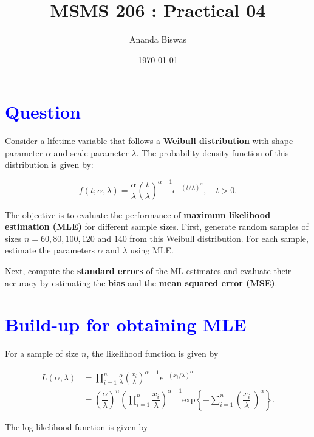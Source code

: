 \documentclass[11pt, a4paper]{article}\usepackage[]{graphicx}\usepackage[]{xcolor}
\title{MSMS 206 : Practical 04}
\author{Ananda Biswas}
\date{\today}
\begin{document}
\maketitle


\section*{\faArrowAltCircleRight[regular] \textcolor{blue}{Question}}

\hspace{1cm} Consider a lifetime variable that follows a \textbf{Weibull distribution} with shape parameter $\alpha$ and scale parameter $\lambda$. The probability density function of this distribution is given by:

\[
f(t; \alpha, \lambda) = \frac{\alpha}{\lambda} \left( \frac{t}{\lambda} \right)^{\alpha - 1} e^{-(t/\lambda)^\alpha}, \quad t > 0.
\]

The objective is to evaluate the performance of \textbf{maximum likelihood estimation (MLE)} for different sample sizes. First, generate random samples of sizes $n = 60, 80, 100, 120$ and $140$ from this Weibull distribution. For each sample, estimate the parameters $\alpha$ and $\lambda$ using MLE.

Next, compute the \textbf{standard errors} of the ML estimates and evaluate their accuracy by estimating the \textbf{bias} and the \textbf{mean squared error (MSE)}.



\section*{\faArrowAltCircleRight[regular] \textcolor{blue}{Build-up for obtaining MLE}}

For a sample of size $n$, the likelihood function is given by

\begin{align*}
L(\alpha, \lambda) &= \prod \limits_{i = 1}^{n} \frac{\alpha}{\lambda} \left( \frac{x_i}{\lambda} \right)^{\alpha - 1} e^{-(x_i / \lambda)^\alpha} \\
&= \left( \dfrac{\alpha}{\lambda} \right)^n \left( \prod \limits_{i = 1}^{n}  \dfrac{x_i}{\lambda} \right)^{\alpha - 1} \text{exp}\left\{- \sum \limits_{i = 1}^{n} \left( \dfrac{x_i}{\lambda}\ \right)^{\alpha} \right\}.
\end{align*}

\vspace{0.5cm}

The log-likelihood function is given by
\end{document}
